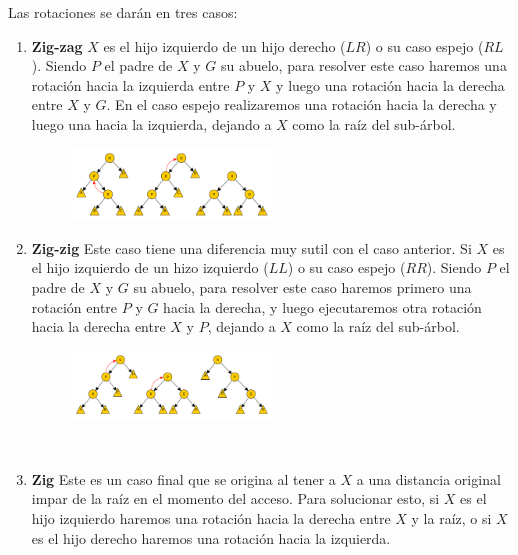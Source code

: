 Las rotaciones se dar\'an en tres casos:

\begin{enumerate}
 \item \textbf{Zig-zag} $X$ es el hijo izquierdo de un hijo derecho ($LR$) o su caso espejo ($RL$). Siendo $P$ el padre de $X$ y $G$ su abuelo, para resolver este caso haremos una rotaci\'on hacia la izquierda entre $P$ y $X$ y luego una rotaci\'on hacia la derecha entre $X$ y $G$. En el caso espejo realizaremos una rotaci\'on hacia la derecha y luego una hacia la izquierda, dejando a $X$ como la ra\'iz del sub-\'arbol.
 
 \begin{figure}
 \centering
 \includegraphics[width=0.5\textwidth]{graficos/ZigZagSplay.pdf}
 \end{figure}
 
 \item \textbf{Zig-zig} Este caso tiene una diferencia muy sutil con el caso anterior. Si $X$ es el hijo izquierdo de un hizo izquierdo ($LL$) o su caso espejo ($RR$). Siendo $P$ el padre de $X$ y $G$ su abuelo, para resolver este caso haremos primero una rotaci\'on entre $P$ y $G$ hacia la derecha, y luego ejecutaremos otra rotaci\'on hacia la derecha entre $X$ y $P$, dejando a $X$ como la ra\'iz del sub-\'arbol.
 
 \begin{figure}
 \centering
 \includegraphics[width=0.5\textwidth]{graficos/ZigZigSplay.pdf}
 \end{figure}
 
 ~
 
 \item \textbf{Zig} Este es un caso final que se origina al tener a $X$ a una distancia original impar de la ra\'iz en el momento del acceso. Para solucionar esto, si $X$ es el hijo izquierdo haremos una rotaci\'on hacia la derecha entre $X$ y la ra\'iz, o si $X$ es el hijo derecho haremos una rotaci\'on hacia la izquierda.
\end{enumerate}

